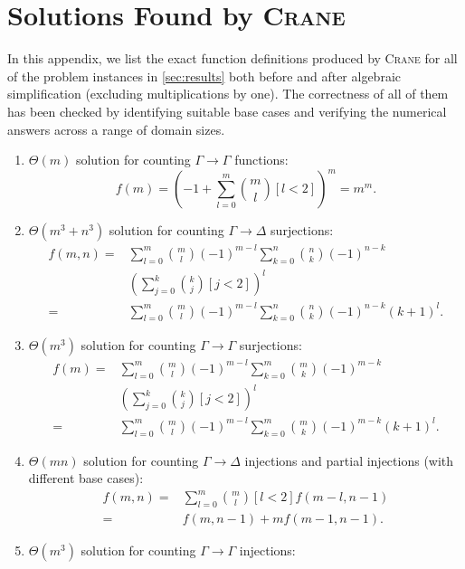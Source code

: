 \documentclass{article}
\theoremstyle{definition}
\begin{document}
\appendix
\section{Solutions Found by \textsc{Crane}}\label{app:solutions}

In this appendix, we list the exact function definitions produced by
\textsc{Crane} for all of the problem instances in \cref{sec:results} both
before and after algebraic simplification (excluding multiplications by one).
The correctness of all of them has been checked by identifying suitable base
cases and verifying the numerical answers across a range of domain sizes.

\begin{enumerate}
  \item $\Theta(m)$ solution for counting $\Gamma \to \Gamma$ functions:
  \[
    f(m) = {\left(-1 + \sum_{l=0}^{m} \binom{m}{l} [l < 2]\right)}^{m} = m^{m}.
  \]
  \item $\Theta(m^3 + n^3)$ solution for counting $\Gamma \to \Delta$
  surjections:
  \begin{align*}
    f(m, n) ={}& \sum_{l=0}^{m} \binom{m}{l}{(-1)}^{m-l} \sum_{k=0}^{n} \binom{n}{k} {(-1)}^{n-k}\\
               &{\left( \sum_{j=0}^{k} \binom{k}{j} [j < 2] \right)}^{l} \\
    ={}& \sum_{l=0}^{m} \binom{m}{l}{(-1)}^{m-l} \sum_{k=0}^{n} \binom{n}{k} {(-1)}^{n-k} {(k+1)}^{l}.
  \end{align*}
  \item $\Theta(m^{3})$ solution for counting $\Gamma \to \Gamma$ surjections:
  \begin{align*}
    f(m) ={}& \sum_{l=0}^{m} \binom{m}{l}{(-1)}^{m-l} \sum_{k=0}^{m} \binom{m}{k} {(-1)}^{m-k}\\
            &{\left( \sum_{j=0}^{k} \binom{k}{j} [j < 2] \right)}^{l} \\
    ={}& \sum_{l=0}^{m} \binom{m}{l}{(-1)}^{m-l} \sum_{k=0}^{m} \binom{m}{k} {(-1)}^{m-k} {(k+1)}^{l}.
  \end{align*}
  \item $\Theta(mn)$ solution for counting $\Gamma \to \Delta$ injections and
  partial injections (with different base cases):
  \begin{align*}
    f(m, n) ={}& \sum_{l=0}^m \binom{m}{l} [l<2] f(m-l, n-1)\\
    ={}& f(m, n-1) + mf(m-1, n-1).
  \end{align*}
  \item $\Theta(m^{3})$ solution for counting $\Gamma \to \Gamma$ injections:

\end{enumerate}
\end{document}
